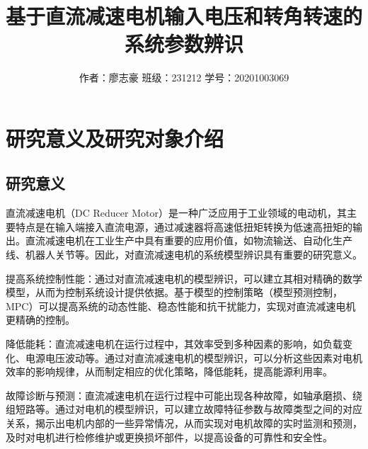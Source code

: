 \documentclass[UTF8, twocolumn]{article}
\begin{document}
\title{基于直流减速电机输入电压和转角转速的系统参数辨识}
\author{作者：廖志豪 \quad 班级：231212 \quad 学号：20201003069}




%
\section{研究意义及研究对象介绍}
\subsection{研究意义}
直流减速电机（DC Reducer Motor）是一种广泛应用于工业领域的电动机，其主要特点是在输入端接入直流电源，通过减速器将高速低扭矩转换为低速高扭矩的输出。直流减速电机在工业生产中具有重要的应用价值，如物流输送、自动化生产线、机器人关节等。因此，对直流减速电机的系统模型辨识具有重要的研究意义。

提高系统控制性能：通过对直流减速电机的模型辨识，可以建立其相对精确的数学模型，从而为控制系统设计提供依据。基于模型的控制策略（模型预测控制，MPC）可以提高系统的动态性能、稳态性能和抗干扰能力，实现对直流减速电机更精确的控制。

降低能耗：直流减速电机在运行过程中，其效率受到多种因素的影响，如负载变化、电源电压波动等。通过对直流减速电机的模型辨识，可以分析这些因素对电机效率的影响规律，从而制定相应的优化策略，降低能耗，提高能源利用率。

故障诊断与预测：直流减速电机在运行过程中可能出现各种故障，如轴承磨损、绕组短路等。通过对电机的模型辨识，可以建立故障特征参数与故障类型之间的对应关系，揭示出电机内部的一些异常情况，从而实现对电机故障的实时监测和预测，及时对电机进行检修维护或更换损坏部件，以提高设备的可靠性和安全性。
\end{document}
